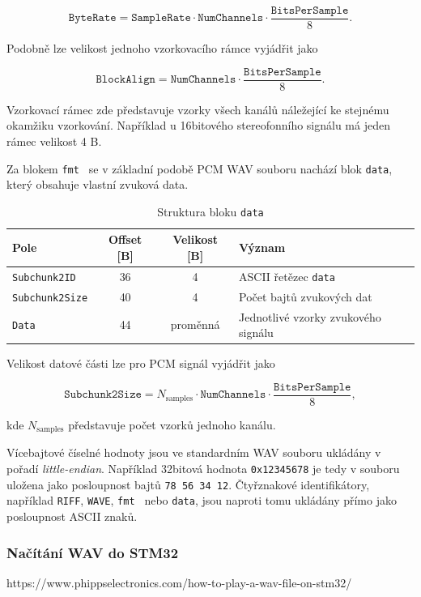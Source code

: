 \documentclass[12pt, a4paper]{article}
\begin{document}
\begin{equation}
    \texttt{ByteRate}
    =
    \texttt{SampleRate}
    \cdot
    \texttt{NumChannels}
    \cdot
    \frac{\texttt{BitsPerSample}}{8}.
\end{equation}

Podobně lze velikost jednoho vzorkovacího rámce vyjádřit jako

\begin{equation}
    \texttt{BlockAlign}
    =
    \texttt{NumChannels}
    \cdot
    \frac{\texttt{BitsPerSample}}{8}.
\end{equation}

Vzorkovací rámec zde představuje vzorky všech kanálů náležející ke
stejnému okamžiku vzorkování. Například u 16bitového stereofonního
signálu má jeden rámec velikost 4 B.

Za blokem \texttt{fmt } se v základní podobě PCM WAV souboru nachází
blok \texttt{data}, který obsahuje vlastní zvuková data.

\begin{table}[ht]
    \centering
    \caption{Struktura bloku \texttt{data}}
    \label{tab:wav_data}
    \begin{tabular}{lccp{7cm}}
        \toprule
        \textbf{Pole} & \textbf{Offset [B]} & \textbf{Velikost [B]} & \textbf{Význam} \\
        \midrule
        \texttt{Subchunk2ID}
        & 36 & 4
        & ASCII řetězec \texttt{data} \\

        \texttt{Subchunk2Size}
        & 40 & 4
        & Počet bajtů zvukových dat \\

        \texttt{Data}
        & 44 & proměnná
        & Jednotlivé vzorky zvukového signálu \\
        \bottomrule
    \end{tabular}
\end{table}

Velikost datové části lze pro PCM signál vyjádřit jako

\begin{equation}
    \texttt{Subchunk2Size}
    =
    N_\mathrm{samples}
    \cdot
    \texttt{NumChannels}
    \cdot
    \frac{\texttt{BitsPerSample}}{8},
\end{equation}

kde $N_\mathrm{samples}$ představuje počet vzorků jednoho kanálu.

Vícebajtové číselné hodnoty jsou ve standardním WAV souboru ukládány v pořadí \textit{little-endian}. Například 32bitová hodnota \texttt{0x12345678} je tedy v souboru uložena jako posloupnost bajtů \texttt{78 56 34 12}. Čtyřznakové identifikátory, například \texttt{RIFF}, \texttt{WAVE}, \texttt{fmt } nebo \texttt{data}, jsou naproti tomu ukládány přímo jako posloupnost ASCII znaků\cite{wav_internet_archive}.

\subsubsection{Načítání WAV do STM32}
https://www.phippselectronics.com/how-to-play-a-wav-file-on-stm32/



\printbibliography
\end{document}

